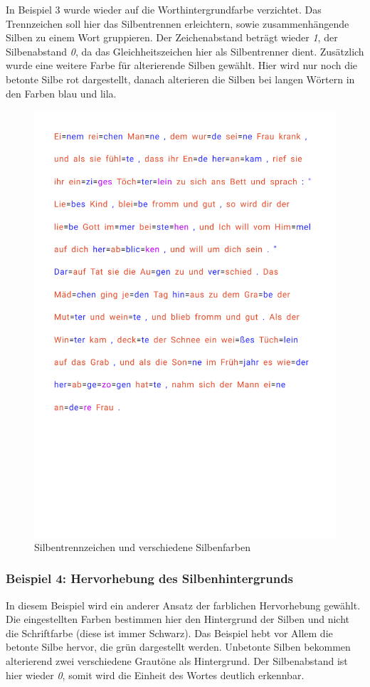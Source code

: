 In Beispiel 3 wurde wieder auf die Worthintergrundfarbe verzichtet. Das Trennzeichen \qq{=} soll hier das Silbentrennen erleichtern, sowie zusammenhängende Silben zu einem Wort gruppieren. Der Zeichenabstand beträgt wieder \textit{1}, der Silbenabstand \textit{0}, da das Gleichheitszeichen hier als Silbentrenner dient. Zusätzlich wurde eine weitere Farbe für alterierende Silben gewählt. Hier wird nur noch die betonte Silbe rot dargestellt, danach alterieren die Silben bei langen Wörtern in den Farben blau und lila.

\begin{figure}[h!]
	\centering
	\includegraphics[width=.7\linewidth, frame]{figures/evaluation/annotation3}
	\caption{Silbentrennzeichen und verschiedene Silbenfarben}
	\label{fig:evaluation-ex3}
\end{figure}
\newpage

\subsubsection{Beispiel 4: Hervorhebung des Silbenhintergrunds}

In diesem Beispiel wird ein anderer Ansatz der farblichen Hervorhebung gewählt. Die eingestellten Farben bestimmen hier den Hintergrund der Silben und nicht die Schriftfarbe (diese ist immer Schwarz). Das Beispiel hebt vor Allem die betonte Silbe hervor, die grün dargestellt werden. Unbetonte Silben bekommen alterierend zwei verschiedene Grautöne als Hintergrund. Der Silbenabstand ist hier wieder \textit{0}, somit wird die Einheit des Wortes deutlich erkennbar.

